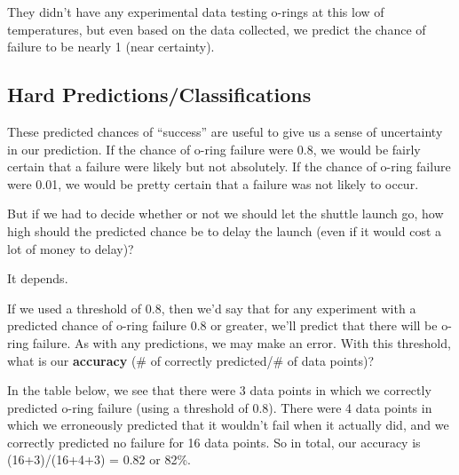 \documentclass[
]{book}
\newenvironment{Shaded}{\begin{snugshade}}{\end{snugshade}}
\newcommand{\DataTypeTok}[1]{\textcolor[rgb]{0.13,0.29,0.53}{#1}}
\newcommand{\FloatTok}[1]{\textcolor[rgb]{0.00,0.00,0.81}{#1}}
\newcommand{\KeywordTok}[1]{\textcolor[rgb]{0.13,0.29,0.53}{\textbf{#1}}}
\newcommand{\NormalTok}[1]{#1}
\newcommand{\OperatorTok}[1]{\textcolor[rgb]{0.81,0.36,0.00}{\textbf{#1}}}
\newcommand{\StringTok}[1]{\textcolor[rgb]{0.31,0.60,0.02}{#1}}
\begin{document}
They didn't have any experimental data testing o-rings at this low of temperatures, but even based on the data collected, we predict the chance of failure to be nearly 1 (near certainty).

\hypertarget{hard-predictionsclassifications}{%
\subsection{Hard Predictions/Classifications}\label{hard-predictionsclassifications}}

These predicted chances of ``success'' are useful to give us a sense of uncertainty in our prediction. If the chance of o-ring failure were 0.8, we would be fairly certain that a failure were likely but not absolutely. If the chance of o-ring failure were 0.01, we would be pretty certain that a failure was not likely to occur.

But if we had to decide whether or not we should let the shuttle launch go, how high should the predicted chance be to delay the launch (even if it would cost a lot of money to delay)?

It depends.

If we used a threshold of 0.8, then we'd say that for any experiment with a predicted chance of o-ring failure 0.8 or greater, we'll predict that there will be o-ring failure. As with any predictions, we may make an error. With this threshold, what is our \textbf{accuracy} (\# of correctly predicted/\# of data points)?

In the table below, we see that there were 3 data points in which we correctly predicted o-ring failure (using a threshold of 0.8). There were 4 data points in which we erroneously predicted that it wouldn't fail when it actually did, and we correctly predicted no failure for 16 data points. So in total, our accuracy is (16+3)/(16+4+3) = 0.82 or 82\%.

\begin{Shaded}
\end{Shaded}
\end{document}

